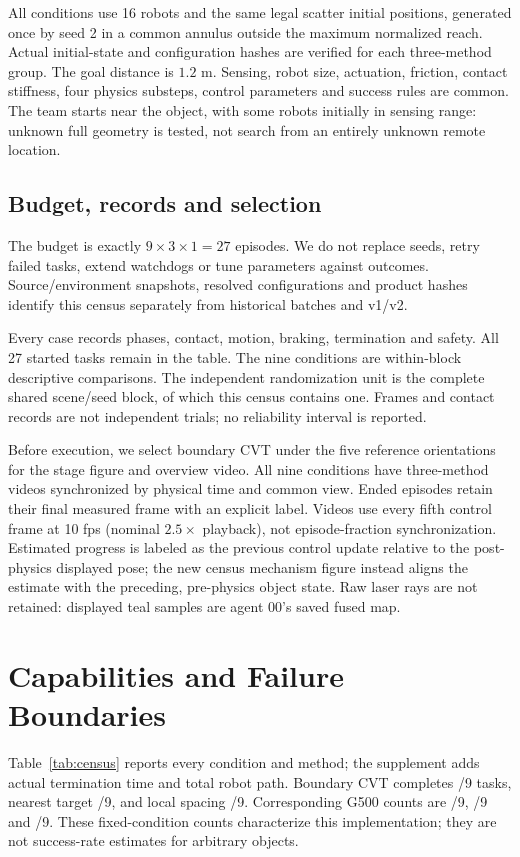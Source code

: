 \documentclass[letterpaper,10pt,conference]{ieeeconf}
\begin{document}
All conditions use 16 robots and the same legal scatter initial positions, generated once by seed 2 in a common annulus outside the maximum normalized reach. Actual initial-state and configuration hashes are verified for each three-method group. The goal distance is $1.2$ m. Sensing, robot size, actuation, friction, contact stiffness, four physics substeps, control parameters and success rules are common. The team starts near the object, with some robots initially in sensing range: unknown full geometry is tested, not search from an entirely unknown remote location.

\subsection{Budget, records and selection}
The budget is exactly $9\times3\times1=27$ episodes. We do not replace seeds, retry failed tasks, extend watchdogs or tune parameters against outcomes. Source/environment snapshots, resolved configurations and product hashes identify this census separately from historical batches and v1/v2.

Every case records phases, contact, motion, braking, termination and safety. All 27 started tasks remain in the table. The nine conditions are within-block descriptive comparisons. The independent randomization unit is the complete shared scene/seed block, of which this census contains one. Frames and contact records are not independent trials; no reliability interval is reported.

Before execution, we select boundary CVT under the five reference orientations for the stage figure and overview video. All nine conditions have three-method videos synchronized by physical time and common view. Ended episodes retain their final measured frame with an explicit label. Videos use every fifth control frame at 10 fps (nominal $2.5\times$ playback), not episode-fraction synchronization. Estimated progress is labeled as the previous control update relative to the post-physics displayed pose; the new census mechanism figure instead aligns the estimate with the preceding, pre-physics object state. Raw laser rays are not retained: displayed teal samples are agent 00's saved fused map.



\section{Capabilities and Failure Boundaries}
Table~\ref{tab:census} reports every condition and method; the supplement adds actual termination time and total robot path. Boundary CVT completes \CvtComplete/9 tasks, nearest target \NearestComplete/9, and local spacing \SpacingComplete/9. Corresponding G500 counts are \CvtG/9, \NearestG/9 and \SpacingG/9. These fixed-condition counts characterize this implementation; they are not success-rate estimates for arbitrary objects.
\end{document}
